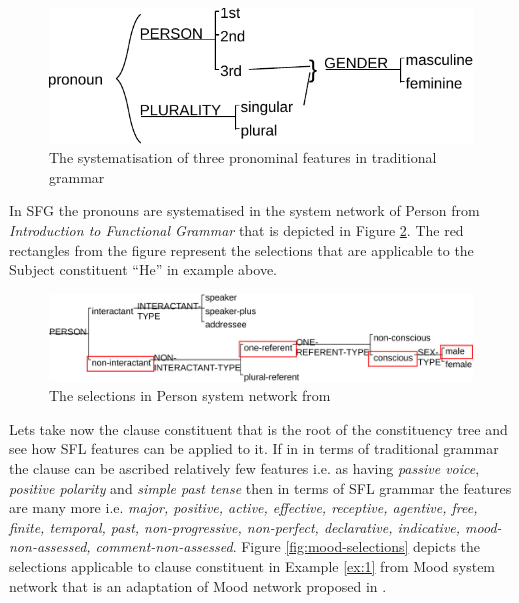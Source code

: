 \begin{figure}[!ht]
    \centering      
    \includegraphics[width=.56\textwidth]{Figures/Example/traditional-pronoun.pdf}      
    \caption{The systematisation of three pronominal features in traditional grammar}
    \label{fig:traditional-pronoun}
\end{figure}

In SFG the pronouns are systematised in the system network of Person from \textit{Introduction to Functional Grammar} \citep[366]{Halliday2013} that is depicted in Figure \ref{fig:person-system-network}. The red rectangles from the figure represent the selections that are applicable to the Subject constituent ``He'' in example above.

\begin{figure}[!ht]
    \centering      
    \includegraphics[width=.90\textwidth]{Figures/Example/person-selections.pdf}      
    \caption{The selections in Person system network from \citet[366]{Halliday2013} }
    \label{fig:person-system-network}
\end{figure}

Lets take now the clause constituent that is the root of the constituency tree and see how SFL features can be applied to it. If in in terms of traditional grammar the clause can be ascribed relatively few features i.e. as having \textit{passive voice}, \textit{positive polarity} and \textit{simple past tense} then in terms of SFL grammar the features are many more i.e. \textit{major, positive, active, effective, receptive, agentive, free, finite, temporal, past, non-progressive, non-perfect, declarative, indicative, mood-non-assessed, comment-non-assessed}. Figure \ref{fig:mood-selections} depicts the selections applicable to clause constituent in Example \ref{ex:1} from Mood system network that is an adaptation of Mood network proposed in \citet[162]{Halliday2013}. 

